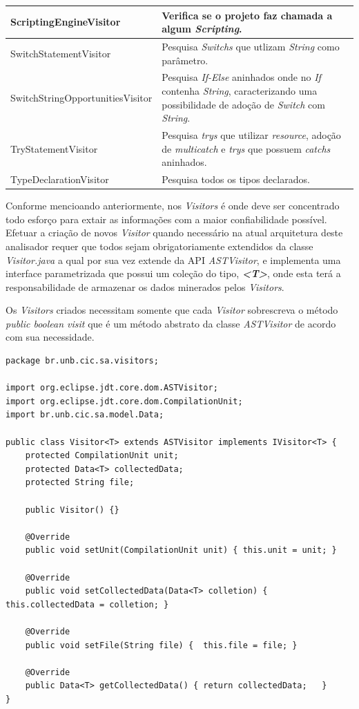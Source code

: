 \begin{table}[ht!]
\begin{tabular}{ >{\arraybackslash}p{2.2in} | >{\arraybackslash}m{3.8in} }
			ScriptingEngineVisitor & Verifica se o projeto faz chamada a algum \textit{Scripting}.\\ \hline
			
			SwitchStatementVisitor & Pesquisa \textit{Switchs} que utlizam \textit{String} como parâmetro.\\ \hline
			
			SwitchStringOpportunitiesVisitor &  Pesquisa \textit{If-Else} aninhados onde no \textit{If} contenha \textit{String}, caracterizando uma possibilidade de adoção de \textit{Switch} com \textit{String}.\\ \hline
		
			TryStatementVisitor & Pesquisa \textit{trys} que utilizar \textit{resource}, adoção de \textit{multicatch} e \textit{trys} que possuem \textit{catchs} aninhados.\\ \hline
			
			TypeDeclarationVisitor & Pesquisa todos os tipos declarados.\\ \hline 		
		\end{tabular}
\end{table}


Conforme mencioando anteriormente, nos \textit{Visitors} é onde deve ser concentrado todo esforço para extair as informações com a maior confiabilidade possível. Efetuar a criação de novos \textit{Visitor} quando necessário na atual arquitetura deste analisador requer que todos sejam  obrigatoriamente extendidos da classe \textit{Visitor.java} a qual por sua vez extende da \acs{API}  \textit{ASTVisitor}, e implementa uma interface parametrizada que possui um coleção do tipo, \textit{\textbf{<T>}}, onde esta terá a responsabilidade de armazenar os dados minerados pelos \textit{Visitors}. 

Os \textit{Visitors} criados necessitam somente que cada \textit{Visitor} sobrescreva o método \textit{public boolean visit} que é um método abstrato da classe \textit{ASTVisitor} de acordo com sua necessidade.

\begin{lstlisting}
package br.unb.cic.sa.visitors;

import org.eclipse.jdt.core.dom.ASTVisitor;
import org.eclipse.jdt.core.dom.CompilationUnit;
import br.unb.cic.sa.model.Data;

public class Visitor<T> extends ASTVisitor implements IVisitor<T> {
	protected CompilationUnit unit;
	protected Data<T> collectedData;
	protected String file;
	
	public Visitor() {}
	
	@Override
	public void setUnit(CompilationUnit unit) { this.unit = unit; }
	
	@Override
	public void setCollectedData(Data<T> colletion) { this.collectedData = colletion; }
	
	@Override
	public void setFile(String file) {	this.file = file; }

	@Override
	public Data<T> getCollectedData() {	return collectedData;	}	
}
\end{lstlisting}


